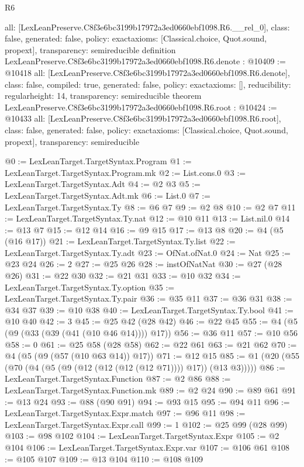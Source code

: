 \begin{lexlean}{R6}
\begin{coremodule}
{  all: [LexLeanPreserve.C8f3e6bc3199b17972a3ed0660ebf1098.R6.__rel_0],
  class: false,
  generated: false,
  policy: exact{axioms: [Classical.choice, Quot.sound, propext]},
  transparency: semireducible
}
definition LexLeanPreserve.C8f3e6bc3199b17972a3ed0660ebf1098.R6.denote : @10409 := @10418 {
  all: [LexLeanPreserve.C8f3e6bc3199b17972a3ed0660ebf1098.R6.denote],
  class: false,
  compiled: true,
  generated: false,
  policy: exact{axioms: []},
  reducibility: regular{height: 14},
  transparency: semireducible
}
theorem LexLeanPreserve.C8f3e6bc3199b17972a3ed0660ebf1098.R6.root : @10424 := @10433 {
  all: [LexLeanPreserve.C8f3e6bc3199b17972a3ed0660ebf1098.R6.root],
  class: false,
  generated: false,
  policy: exact{axioms: [Classical.choice, Quot.sound, propext]},
  transparency: semireducible
}

@0 := LexLeanTarget.TargetSyntax.Program
@1 := LexLeanTarget.TargetSyntax.Program.mk
@2 := List.cons.{0}
@3 := LexLeanTarget.TargetSyntax.Adt
@4 := @2 @3
@5 := LexLeanTarget.TargetSyntax.Adt.mk
@6 := List.{0}
@7 := LexLeanTarget.TargetSyntax.Ty
@8 := @6 @7
@9 := @2 @8
@10 := @2 @7
@11 := LexLeanTarget.TargetSyntax.Ty.nat
@12 := @10 @11
@13 := List.nil.{0}
@14 := @13 @7
@15 := @12 @14
@16 := @9 @15
@17 := @13 @8
@20 := @4 (@5 (@16 @17))
@21 := LexLeanTarget.TargetSyntax.Ty.list
@22 := LexLeanTarget.TargetSyntax.Ty.adt
@23 := OfNat.ofNat.{0}
@24 := Nat
@25 := @23 @24
@26 := 2
@27 := @25 @26
@28 := instOfNatNat
@30 := @27 (@28 @26)
@31 := @22 @30
@32 := @21 @31
@33 := @10 @32
@34 := LexLeanTarget.TargetSyntax.Ty.option
@35 := LexLeanTarget.TargetSyntax.Ty.pair
@36 := @35 @11
@37 := @36 @31
@38 := @34 @37
@39 := @10 @38
@40 := LexLeanTarget.TargetSyntax.Ty.bool
@41 := @10 @40
@42 := 3
@45 := @25 @42 (@28 @42)
@46 := @22 @45
@55 := @4 (@5 (@9 (@33 (@39 (@41 (@10 @46 @14)))) @17))
@56 := @36 @11
@57 := @10 @56
@58 := 0
@61 := @25 @58 (@28 @58)
@62 := @22 @61
@63 := @21 @62
@70 := @4 (@5 (@9 (@57 (@10 @63 @14)) @17))
@71 := @12 @15
@85 := @1 (@20 (@55 (@70 (@4 (@5 (@9 (@12 (@12 (@12 (@12 @71)))) @17)) (@13 @3)))))
@86 := LexLeanTarget.TargetSyntax.Function
@87 := @2 @86
@88 := LexLeanTarget.TargetSyntax.Function.mk
@89 := @2 @24
@90 := @89 @61
@91 := @13 @24
@93 := @88 (@90 @91)
@94 := @93 @15
@95 := @94 @11
@96 := LexLeanTarget.TargetSyntax.Expr.match
@97 := @96 @11
@98 := LexLeanTarget.TargetSyntax.Expr.call
@99 := 1
@102 := @25 @99 (@28 @99)
@103 := @98 @102
@104 := LexLeanTarget.TargetSyntax.Expr
@105 := @2 @104
@106 := LexLeanTarget.TargetSyntax.Expr.var
@107 := @106 @61
@108 := @105 @107
@109 := @13 @104
@110 := @108 @109

\end{coremodule}
\end{lexlean}
